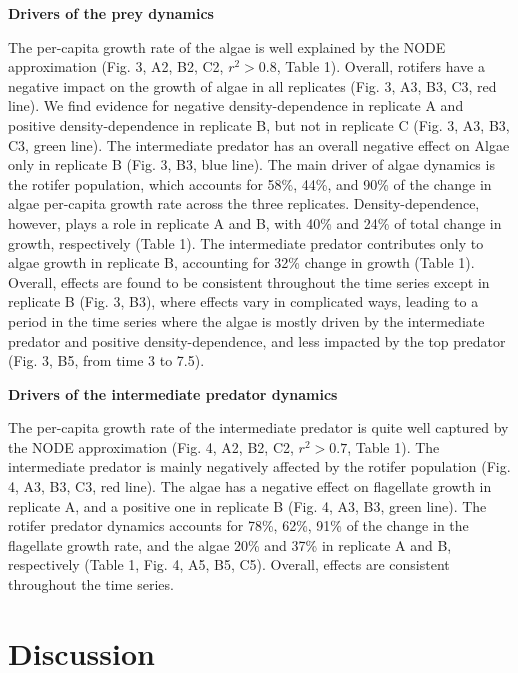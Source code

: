 \documentclass[11pt, oneside]{article}
\begin{document}
\textbf{Drivers of the prey dynamics}

The per-capita growth rate of the algae is well explained by the NODE approximation (Fig. 3, A2, B2, C2, $r^2 > 0.8$, Table 1).
Overall, rotifers have a negative impact on the growth of algae in all replicates (Fig. 3, A3, B3, C3, red line).
We find evidence for negative density-dependence in replicate A and positive density-dependence in replicate B, but not in replicate C (Fig. 3, A3, B3, C3, green line).
The intermediate predator has an overall negative effect on Algae only in replicate B (Fig. 3, B3, blue line).
The main driver of algae dynamics is the rotifer population, which accounts for 58\%, 44\%, and 90\% of the change in algae per-capita growth rate across the three replicates.
Density-dependence, however, plays a role in replicate A and B, with 40\% and 24\% of total change in growth, respectively (Table 1).
The intermediate predator contributes only to algae growth in replicate B, accounting for 32\% change in growth (Table 1).
Overall, effects are found to be consistent throughout the time series except in replicate B (Fig. 3, B3), where effects vary in complicated ways, leading to a period in the time series where the algae is mostly driven by the intermediate predator and positive density-dependence, and less impacted by the top predator (Fig. 3, B5, from time 3 to 7.5).

\textbf{Drivers of the intermediate predator dynamics}

The per-capita growth rate of the intermediate predator is quite well captured by the NODE approximation (Fig. 4, A2, B2, C2, $r^2 > 0.7$, Table 1).
The intermediate predator is mainly negatively affected by the rotifer population (Fig. 4, A3, B3, C3, red line).
The algae has a negative effect on flagellate growth in replicate A, and a positive one in replicate B (Fig. 4, A3, B3, green line).
The rotifer predator dynamics accounts for 78\%, 62\%, 91\% of the change in the flagellate growth rate, and the algae 20\% and 37\% in replicate A and B, respectively (Table 1, Fig. 4, A5, B5, C5).
Overall, effects are consistent throughout the time series.

\section{Discussion}
\end{document}
